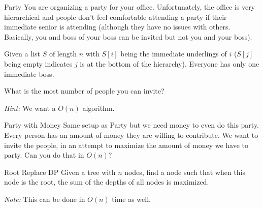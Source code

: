 \documentclass{beamer}
\begin{document}
\begin{frame}{Party}
You are organizing a party for your office. Unfortunately, the office is very hierarchical and people don't feel comfortable attending a party if their immediate senior is attending (although they have no issues with others. Basically, you and boss of your boss can be invited but not you and your boss).

\medskip
Given a list $S$ of length $n$ with $S[i]$ being the immediate underlings of $i$ ($S[j]$ being empty indicates $j$ is at the bottom of the hierarchy). Everyone has only one immediate boss.

\medskip
What is the most number of people you can invite?

\medskip
\textit{Hint:} We want a $O(n)$ algorithm.
\end{frame}

\begin{frame}{}
\end{frame}
\begin{frame}{}
\end{frame}

\begin{frame}{Party with Money}
Same setup as Party but we need money to even do this party. Every person has an amount of money they are willing to contribute. We want to invite the people, in an attempt to maximize the amount of money we have to party. Can you do that in $O(n)$?
\end{frame}

\begin{frame}{}
\end{frame}
\begin{frame}{}
\end{frame}

\begin{frame}{Root Replace DP}
Given a tree with $n$ nodes, find a node such that when this node is the root, the sum of the depths of all nodes is maximized.

\medskip
\textit{Note:} This can be done in $O(n)$ time as well.
\end{frame}

\begin{frame}{}
\end{frame}
\begin{frame}{}
\end{frame}
\end{document}
